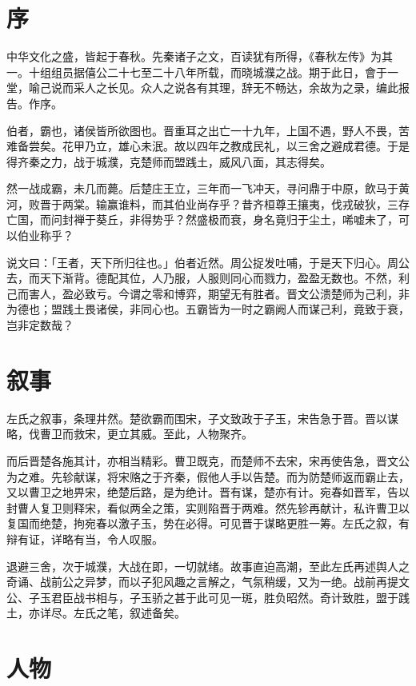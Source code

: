 \documentclass{article}
\date{}
\begin{document}
\makecover
\tableofcontents

\section{序}

中华文化之盛，皆起于春秋。先秦诸子之文，百读犹有所得，《春秋左传》为其一。十组组员据僖公二十七至二十八年所载，而晓城濮之战。期于此日，會于一堂，喻己说而采人之长见。众人之说各有其理，辞无不畅达，余故为之录，编此报告。作序。

伯者，霸也，诸侯皆所欲图也。晋重耳之出亡一十九年，上国不遇，野人不畏，苦难备尝矣。花甲乃立，雄心未泯。故以四年之教成民礼，以三舍之避成君德。于是得齐秦之力，战于城濮，克楚师而盟践土，威风八面，其志得矣。

然一战成霸，未几而薨。后楚庄王立，三年而一飞冲天，寻问鼎于中原，飲马于黄河，败晋于两棠。输赢谁料，而其伯业尚存乎？昔齐桓尊王攘夷，伐戎破狄，三存亡国，而问封禅于葵丘，非得势乎？然盛极而衰，身名竟归于尘土，唏嘘未了，可以伯业称乎？

说文曰：「王者，天下所归往也。」伯者近然。周公捉发吐哺，于是天下归心。周公去，而天下渐背。德配其位，人乃服，人服则同心而戮力，盈盈无数也。不然，利己而害人，盈必致亏。今谓之零和博弈，期望无有胜者。晋文公溃楚师为己利，非为德也；盟践土畏诸侯，非同心也。五霸皆为一时之霸阙人而谋己利，竟致于衰，岂非定数哉？

\section{叙事}

左氏之叙事，条理井然。楚欲霸而围宋，子文致政于子玉，宋告急于晋。晋以谋略，伐曹卫而救宋，更立其威。至此，人物聚齐。

而后晋楚各施其计，亦相当精彩。曹卫既克，而楚师不去宋，宋再使告急，晋文公为之难。先轸献谋，将宋赂之于齐秦，假他人手以告楚。而为防楚师返而霸止去，又以曹卫之地畀宋，绝楚后路，是为绝计。晋有谋，楚亦有计。宛春如晋军，告以封曹人复卫则释宋，看似两全之策，实则陷晋于两难。然先轸再献计，私许曹卫以复国而绝楚，拘宛春以激子玉，势在必得。可见晋于谋略更胜一筹。左氏之叙，有辩有证，详略有当，令人叹服。

退避三舍，次于城濮，大战在即，一切就绪。故事直迫高潮，至此左氏再述舆人之奇诵、战前公之异梦，而以子犯风趣之言解之，气氛稍缓，又为一绝。战前再提文公、子玉君臣战书相与，子玉骄之甚于此可见一斑，胜负昭然。奇计致胜，盟于践土，亦详尽。左氏之笔，叙述备矣。

\section{人物}
\end{document}
